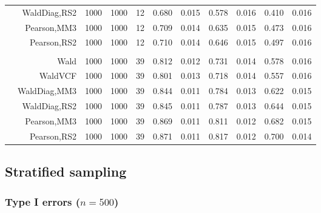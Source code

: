 \documentclass[
]{article}
\begin{document}
\begin{table}[H]
{\begin{tabular}[t]{lrrrrrrrlrr}
\hspace{1em} & WaldDiag,RS2 & 1000 & 1000 & 12 & 0.680 & 0.015 & 0.578 & 0.016 & 0.410 & 0.016\\

\hspace{1em} & Pearson,MM3 & 1000 & 1000 & 12 & 0.709 & 0.014 & 0.635 & 0.015 & 0.473 & 0.016\\

\hspace{1em} & Pearson,RS2 & 1000 & 1000 & 12 & 0.710 & 0.014 & 0.646 & 0.015 & 0.497 & 0.016\\
\cmidrule{1-11}
\addlinespace[0.3em]
\multicolumn{11}{l}{\textbf{3F 15V}}\\
\hspace{1em} & Wald & 1000 & 1000 & 39 & 0.812 & 0.012 & 0.731 & 0.014 & 0.578 & 0.016\\

\hspace{1em} & WaldVCF & 1000 & 1000 & 39 & 0.801 & 0.013 & 0.718 & 0.014 & 0.557 & 0.016\\

\hspace{1em} & WaldDiag,MM3 & 1000 & 1000 & 39 & 0.844 & 0.011 & 0.784 & 0.013 & 0.622 & 0.015\\

\hspace{1em} & WaldDiag,RS2 & 1000 & 1000 & 39 & 0.845 & 0.011 & 0.787 & 0.013 & 0.644 & 0.015\\

\hspace{1em} & Pearson,MM3 & 1000 & 1000 & 39 & 0.869 & 0.011 & 0.811 & 0.012 & 0.682 & 0.015\\

\hspace{1em} & Pearson,RS2 & 1000 & 1000 & 39 & 0.871 & 0.011 & 0.817 & 0.012 & 0.700 & 0.014\\
\bottomrule
\end{tabular}}
\endgroup{}
\end{table}

\hypertarget{stratified-sampling}{%
\subsection{Stratified sampling}\label{stratified-sampling}}

\hypertarget{type-i-errors-n500-1}{%
\subsubsection{\texorpdfstring{Type I errors
(\(n=500\))}{Type I errors (n=500)}}\label{type-i-errors-n500-1}}
\end{document}
